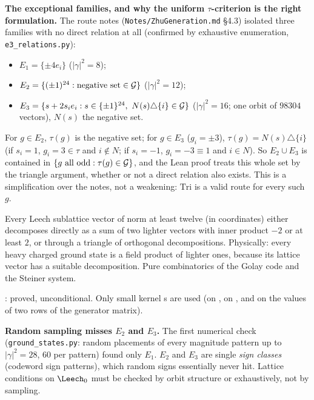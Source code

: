 \begin{dictionary}
\textbf{The exceptional families, and why the uniform $\tau$-criterion is the right formulation.}  The
route notes (\texttt{Notes/ZhuGeneration.md} §4.3) isolated three families with no direct relation at
all (confirmed by exhaustive enumeration, \texttt{e3\_relations.py}):
\begin{itemize}
\item $E_1=\{\pm4e_i\}$ ($|\gamma|^2=8$);
\item $E_2=\{(\pm1)^{24}:\text{negative set}\in\mathcal{G}\}$ ($|\gamma|^2=12$);
\item $E_3=\{s+2s_ie_i : s\in\{\pm1\}^{24},\ N(s)\triangle\{i\}\in\chtwelveG\}$ ($|\gamma|^2=16$; one
  orbit of $98304$ vectors), $N(s)$ the negative set.
\end{itemize}
For $g\in E_2$, $\tau(g)$ is the negative set; for $g\in E_3$ ($g_i=\pm3$), $\tau(g)=N(s)\triangle\{i\}$ (if
$s_i=1$, $g_i=3\in\tau$ and $i\notin N$; if $s_i=-1$, $g_i=-3\equiv1$ and $i\in N$).  So $E_2\cup E_3$ is
contained in $\{g\text{ all odd}:\tau(g)\in\mathcal{G}\}$, and the Lean proof treats this whole set by the
triangle argument, whether or not a direct relation also exists.  This is a simplification over the
notes, not a weakening: $\mathrm{Tri}$ is a valid route for every such $g$.
\end{dictionary}

\begin{physics}
Every Leech sublattice vector of norm at least twelve (in coordinates) either decomposes directly as a sum of two lighter vectors with inner product $-2$ or at least $2$, or through a triangle of orthogonal decompositions. Physically: every heavy charged ground state is a field product of lighter ones, because its lattice vector has a suitable decomposition. Pure combinatorics of the Golay code and the Steiner system.
\end{physics}

\begin{status}: proved, unconditional.  Only small kernel s are used
(on , on , and on the values of two rows of the generator matrix).\end{status}

\begin{warning}
\textbf{Random sampling misses $E_2$ and $E_3$.}  The first numerical check (\texttt{ground\_states.py}:
random placements of every magnitude pattern up to $|\gamma|^2=28$, $60$ per pattern) found only $E_1$.
$E_2$ and $E_3$ are single \emph{sign classes} (codeword sign patterns), which random signs essentially
never hit.  Lattice conditions on $\Leech_0$ must be checked by orbit structure or exhaustively, not by
sampling.
\end{warning}

